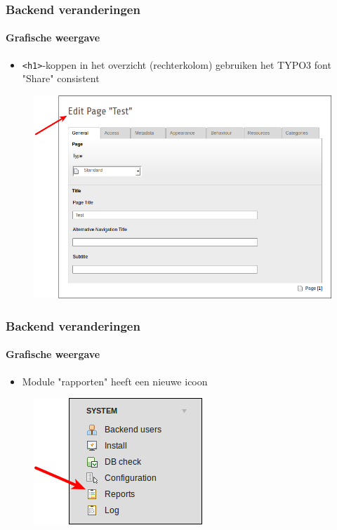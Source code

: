 
\begin{frame}[fragile]
	\frametitle{Backend veranderingen}
	\framesubtitle{Grafische weergave}

	\begin{itemize}
		\item \texttt{<h1>}-koppen in het overzicht (rechterkolom) gebruiken het TYPO3 font "Share" consistent
	\end{itemize}

	\begin{figure}
		\includegraphics[width=0.6\linewidth]{Images/BackendChanges/ConsistantFont.png}
	\end{figure}

\end{frame}


\begin{frame}[fragile]
	\frametitle{Backend veranderingen}
	\framesubtitle{Grafische weergave}

	\begin{itemize}
		\item Module "rapporten" heeft een nieuwe icoon
	\end{itemize}

	\begin{figure}
		\includegraphics[width=0.35\linewidth]{Images/BackendChanges/ModuleReportsIcon.png}
	\end{figure}

\end{frame}

